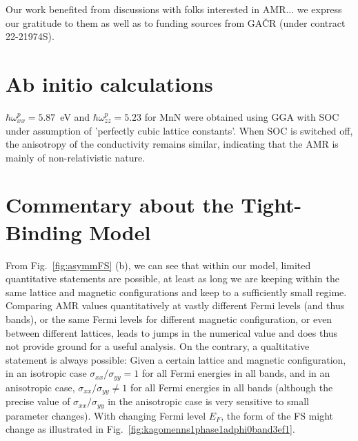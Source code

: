 \documentclass[prb,showpacs,amsmath,amssymb,superscriptaddress,twocolumn,floatfix]{revtex4-1}
\begin{document}
Our work benefited from discussions with folks interested in AMR...
we express our gratitude to them as well as to funding sources from GA\v{C}R (under contract 22-21974S).
 
\begin{appendix}

\section{Ab initio calculations}
\label{apx_A}

$\hbar\omega^p_{xx}=5.87$~eV and $\hbar\omega^p_{zz}=5.23$ for MnN
were obtained using GGA with SOC under assumption of 'perfectly cubic
lattice constants'. When SOC is switched off, the anisotropy of the conductivity remains similar, indicating that the AMR is mainly of non-relativistic nature.

\section{Commentary about the Tight-Binding Model}
\label{apx_B}

From Fig.~\ref{fig:asymmFS} (b), we can see that within our model, limited quantitative statements are possible, at least as long we are keeping within the same lattice and magnetic configurations and keep to a sufficiently small regime. Comparing AMR values quantitatively at vastly different Fermi levels (and thus bands), or the same Fermi levels for different magnetic configuration, or even between different lattices, leads to jumps in the numerical value and does thus not provide ground for a useful analysis. On the contrary, a qualtitative statement is always possible: Given a certain lattice and magnetic configuration, in an isotropic case $\sigma_{xx} / \sigma_{yy} = 1$ for all Fermi energies in all bands, and in an anisotropic case, $\sigma_{xx} / \sigma_{yy} \neq 1$ for all Fermi energies in all bands (although the precise value of $\sigma_{xx} / \sigma_{yy}$ in the anisotropic case is very sensitive to small parameter changes). With changing Fermi level $E_F$, the form of the FS might change as illustrated in Fig.~\ref{fig:kagomenns1phase1adphi0band3ef1}.



\end{appendix}
\end{document}

